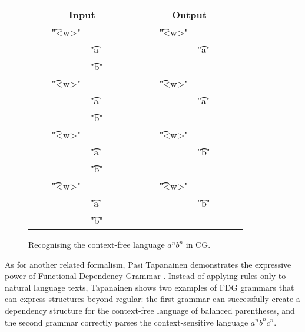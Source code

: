  



\def\wwf{~~~~\t{"<w>"}}
\def\alm{\t{"a"}~~~~~~}
\def\blm{\t{"b"}~~~~~~}

\begin{figure}[ht]
\centering

\begin{tabular}{cl |  rl}
\multicolumn{2}{c|}{\textbf{Input}} & \multicolumn{2}{c}{\textbf{Output}} \\ \hline

\wwf  &        &  \wwf &        \\
         & \alm  &          & \alm  \\
         & \blm  &          &        \\
\wwf  &        &  \wwf &        \\
         & \alm  &          & \alm  \\
         & \blm  &          &        \\
\wwf  &        &  \wwf &        \\
         & \alm  &          & \blm  \\
         & \blm  &          &        \\
\wwf  &        &  \wwf &        \\
         & \alm  &          & \blm  \\
         & \blm  &          &        \\ 
\end{tabular}

\caption{Recognising the context-free language $a^nb^n$ in CG.}
\label{fig:anbn}
\end{figure}


As for another related formalism, Pasi Tapanainen \cite{tapanainen1999phd} demonstrates the expressive power of Functional Dependency Grammar \cite{tapanainen97fdg}.
Instead of applying rules only to natural language texts, Tapanainen shows 
two examples of FDG grammars that can express structures beyond regular: 
the first grammar can successfully create a dependency structure for the context-free language of balanced parentheses, %
and the second grammar correctly parses the context-sensitive language $a^nb^nc^n$.

